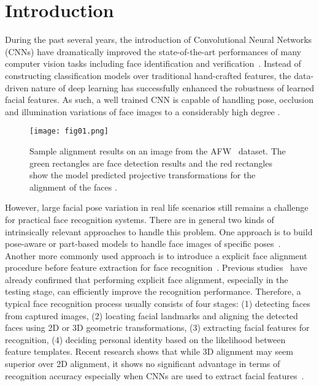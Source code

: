 \documentclass[10pt,twocolumn,letterpaper]{article}
\begin{document}
\section{Introduction}

During the past several years, the introduction of Convolutional Neural Networks (CNNs) have dramatically improved the state-of-the-art performances of many computer vision tasks including face identification and verification~\cite{sun2013hybrid,sun2014deep,sun2015deepid3,taigman2014deepface,schroff2015facenet,parkhi2015deep,wen2016discriminative}.
Instead of constructing classification models over traditional hand-crafted features, the data-driven nature of deep learning has successfully enhanced the robustness of learned facial features. 
As such, a well trained CNN is capable of handling pose, occlusion and illumination variations of face images to a considerably high degree \cite{schroff2015facenet,parkhi2015deep,ding2016comprehensive}.

\begin{figure}[b]
\begin{center}
\texttt{[image: fig01.png]}
\end{center}
   \caption{Sample alignment results on an image from the AFW~\cite{Zhu2012Face} dataset. The green rectangles are face detection results and the red rectangles show the model predicted projective transformations for the alignment of the faces .}
\label{fig01}
\end{figure}

However, large facial pose variation in real life scenarios still remains a challenge for practical face recognition systems. 
There are in general two kinds of intrinsically relevant approaches to handle this problem.
One approach is to build pose-aware or part-based models to handle face images of specific poses~\cite{masi2016pose,liao2013partial}. 
Another more commonly used approach is to introduce a explicit face alignment procedure before feature extraction for face recognition~\cite{sun2014deep,hu2016face,taigman2014deepface,ding2016comprehensive}.  
Previous studies~\cite{schroff2015facenet,parkhi2015deep} have already confirmed that performing explicit face alignment, especially in the testing stage, can efficiently improve the recognition performance. 
Therefore, a typical face recognition process usually consists of four stages: (1) detecting faces from captured images, (2) locating facial landmarks and aligning the detected faces using 2D or 3D geometric transformations, (3) extracting facial features for recognition, (4) deciding personal identity based on the likelihood between feature templates. 
Recent research shows that while 3D alignment may seem superior over 2D alignment, it shows no significant advantage in terms of recognition accuracy especially when CNNs are used to extract facial features~\cite{banerjee2016frontalize}.
\end{document}

